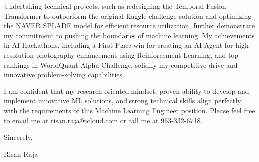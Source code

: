 \documentclass{ExpressiveCoverLetter}
\begin{document}

Undertaking technical projects, such as redesigning the Temporal Fusion 
Transformer to outperform the original Kaggle challenge solution 
and optimizing the NAVER SPLADE model for efficient resource 
utilization, further demonstrate my commitment to pushing the boundaries 
of machine learning. My achievements in AI Hackathons, including a First 
Place win for creating an AI Agent for high-resolution photography
enhancement using Reinforcement Learning, and top rankings in WorldQuant Alpha
Challenge, solidify my competitive drive and innovative problem-solving capabilities.

I am confident that my research-oriented mindset, 
proven ability to develop and implement innovative ML solutions, 
and strong technical skills align perfectly with the requirements of 
this Machine Learning Engineer position. Please feel free to
email me at \href{mailto:risan.raja@icloud.com}{risan.raja@icloud.com} or
call me at \href{tel:+91-963-332-6718}{963-332-6718}.

Sincerely,
\vspace{.15in}

Risan Raja
\end{document}

